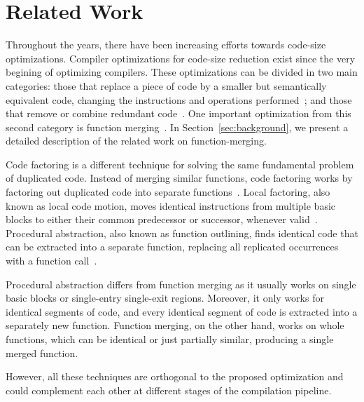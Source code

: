 \section{Related Work}

Throughout the years, there have been increasing efforts towards code-size
optimizations.
Compiler optimizations for code-size reduction exist since the very begining
of optimizing compilers.
These optimizations can be divided in two main categories:
those that replace a piece of code by a smaller but semantically equivalent code,
changing the instructions and operations performed~\cite{massalin87,tanenbaum82};
and those that remove or combine redundant code~\cite{cocke70,knoop94,ernst97,
                                              cooper99,debray00,chen03,loki04}.
One important optimization from this second category is function
merging~\cite{tallam10,edler14}.
In Section~\ref{sec:background}, we present a detailed description of the
related work on function-merging.



Code factoring is a different technique for solving the same fundamental problem
of duplicated code.
Instead of merging similar functions, code factoring works by factoring out
duplicated code into separate functions~\cite{loki04}.
Local factoring, also known as local code motion, moves identical instructions
from multiple basic blocks to either their common predecessor or successor,
whenever valid~\cite{knoop94,briggs94,loki04}.
Procedural abstraction, also known as function outlining, finds identical code
that can be extracted into a separate function, replacing all replicated
occurrences with a function call~\cite{loki04,dreweke07}.

Procedural abstraction differs from function merging as it usually works on
single basic blocks or single-entry single-exit regions.
Moreover, it only works for identical segments of code, and every identical
segment of code is extracted into a separately new function.
Function merging, on the other hand, works on whole functions, which can be
identical or just partially similar, producing a single merged function.

However, all these techniques are orthogonal to the proposed optimization and
could complement each other at different stages of the compilation pipeline.
